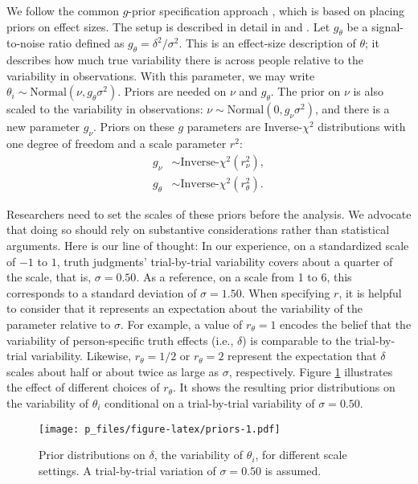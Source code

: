 \documentclass[
  english,
  ,man,floatsintext]{apa6}
\begin{document}
We follow the common \(g\)-prior specification approach \autocite{zellner1986}, which is based on placing priors on effect sizes. The setup is described in detail in \textcite{haaf2017} and \textcite{rouder2012}. Let \(g_\theta\) be a signal-to-noise ratio defined as \(g_\theta = \delta^2/\sigma^2\). This is an effect-size description of \(\theta\); it describes how much true variability there is across people relative to the variability in observations. With this parameter, we may write \(\theta_i \sim \mbox{Normal}(\nu,g_\theta\sigma^2)\). Priors are needed on \(\nu\) and \(g_\theta\). The prior on \(\nu\) is also scaled to the variability in observations: \(\nu \sim \mbox{Normal}(0,g_\nu\sigma^2)\), and there is a new parameter \(g_\nu\). Priors on these \(g\) parameters are Inverse-\(\chi^2\) distributions with one degree of freedom and a scale parameter \(r^2\):
\begin{equation}
\begin{split}
g_\nu & \sim \text{Inverse-}\chi^2(r_\nu^2),\\
g_\theta & \sim \text{Inverse-}\chi^2(r_\theta^2).
\end{split}
\end{equation}

Researchers need to set the scales of these priors before the analysis. We advocate that doing so should rely on substantive considerations rather than statistical arguments. Here is our line of thought: In our experience, on a standardized scale of \(-1\) to \(1\), truth judgments' trial-by-trial variability covers about a quarter of the scale, that is, \(\sigma = 0.50\). As a reference, on a scale from 1 to 6, this corresponds to a standard deviation of \(\sigma = 1.50\). When specifying \(r\), it is helpful to consider that it represents an expectation about the variability of the parameter relative to \(\sigma\). For example, a value of \(r_\theta = 1\) encodes the belief that the variability of person-specific truth effects (i.e., \(\delta\)) is comparable to the trial-by-trial variability. Likewise, \(r_\theta = 1/2\) or \(r_\theta = 2\) represent the expectation that \(\delta\) scales about half or about twice as large as \(\sigma\), respectively. Figure \ref{fig:priors} illustrates the effect of different choices of \(r_\theta\). It shows the resulting prior distributions on the variability of \(\theta_i\) conditional on a trial-by-trial variability of \(\sigma = 0.50\).

\begin{figure}
\centering
\texttt{[image: p\_files/figure-latex/priors-1.pdf]}
\caption{\label{fig:priors}Prior distributions on \(\delta\), the variability of \(\theta_i\), for different scale settings. A trial-by-trial variation of \(\sigma = 0.50\) is assumed.}
\end{figure}
\end{document}
